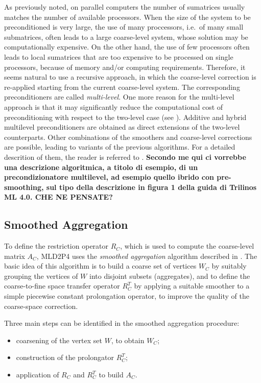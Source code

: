 As previously noted, on parallel computers the number of sumatrices usually matches
the number of available processors. When the size of the system to be preconditioned
is very large, the use of many proccessors, i.e.\ of many small submatrices, often
leads to a large coarse-level system, whose solution may be computationally expensive.
On the other hand, the use of few processors often leads to local sumatrices that
are too expensive to be processed on single processors, because of memory and/or
computing requirements. Therefore, it seems natural to use a recursive approach,
in which the coarse-level correction is re-applied starting from the current
coarse-level system. The corresponding preconditioners are called \emph{multi-level}.
One more reason for the multi-level approach is that it may significantly
reduce the computational cost of preconditioning with respect to the two-level case
(see \cite[Chapter 3]{dd2_96}). Additive and hybrid multilevel preconditioners
are obtained as direct extensions of the two-level counterparts. Other combinations
of the smoothers and coarse-level corrections are possible, leading to variants
of the previous algorithms. For a detailed descrition of them, the reader is
referred to \cite[Chapter 3]{dd2_96}.
\textbf{Secondo me qui ci vorrebbe una descrizione algoritmica, a titolo di esempio,
di un precondizionatore multilevel, ad esempio quello ibrido con pre-smoothing, sul tipo
della descrizione in figura 1 della guida di Trilinos ML 4.0. CHE NE PENSATE?}


\subsection{Smoothed Aggregation\label{sec:aggregation}}

To define the restriction operator $R_C$, which is used to compute
the coarse-level matrix $A_C$, MLD2P4 uses the \emph{smoothed aggregation}
algorithm described in \cite{Brezina_Vanek_,Vanek_Mandel_Brezina_}.
The basic idea of this algorithm is to build a coarse set of vertices
$W_C$ by suitably grouping the vertices of $W$ into disjoint subsets
(aggregates), and to define the coarse-to-fine space transfer operator $R_C^T$ by
applying a suitable smoother to a simple piecewise constant
prolongation operator, to improve the quality of the coarse-space correction.

Three main steps can be identified in the smoothed aggregation procedure:
\begin{itemize}
	\item coarsening of the vertex set $W$, to obtain $W_C$;
	\item construction of the prolongator $R_C^T$;
	\item application of $R_C$ and $R_C^T$ to build $A_C$.
\end{itemize}
 
